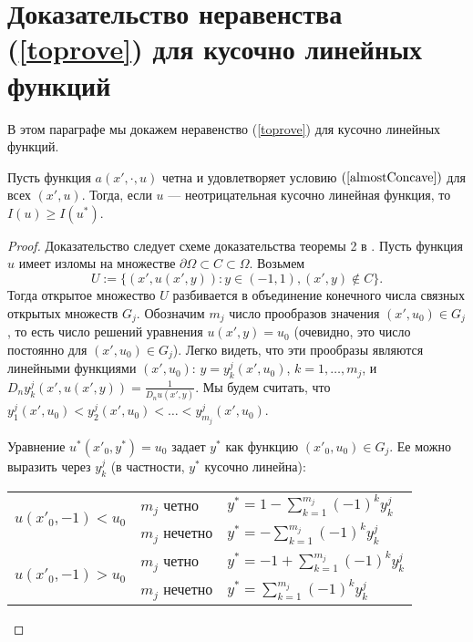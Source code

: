 \section{Доказательство неравенства (\ref{toprove}) для кусочно ли\-ней\-ных функций}

В этом параграфе мы докажем неравенство (\ref{toprove}) для кусочно линейных функций.

\begin{lm}
Пусть функция $a(x', \cdot, u)$ четна и удовлетворяет условию $(\ref{almostConcave})$ для всех $(x', u)$.
Тогда, если $u$ --- неотрицательная кусочно линейная функция, то $I( u ) \ge I( u^* )$.
\end{lm}

\begin{proof}
Доказательство следует схеме доказательства теоремы 2 в \cite{1dim}.
Пусть функция $u$ имеет изломы на множестве $\partial \Omega \subset C \subset \Omega$.
Возьмем $$U := \{ ( x', u( x', y ) ): y \in (-1, 1), (x', y) \not\in C \}.$$
Тогда открытое множество $U$ разбивается в объединение конечного числа связных открытых множеств $G_j$.
Обозначим $m_j$ число прообразов значения $( x', u_0 ) \in G_j$, то есть число решений уравнения $u( x', y ) = u_0$
(очевидно, это число постоянно для $( x', u_0 ) \in G_j$).
Легко видеть, что эти прообразы являются линейными функциями $( x', u_0 )$:
$y = y_k^j( x', u_0 )$, $k = 1, \dots, m_j$,
и $D_n y_k^j( x', u( x', y ) ) = \frac{1}{D_n u( x', y )}$.
Мы будем считать, что $y_1^j(x', u_0) < y_2^j(x', u_0) < \dots < y_{m_j}^j(x', u_0)$.

Уравнение $u^*(x'_0, y^*) = u_0$ задает $y^*$ как функцию $( x'_0, u_0 ) \in G_j$.
Ее можно выразить через $y_k^j$ (в частности, $y^*$ кусочно линейна):

\begin{center}
\begin{tabular}{l|l|l}
\multirow{2}{*}{$u( x'_0, -1 ) < u_0$ \rule[-34pt]{0pt}{65pt}} & $m_j$ четно   & $y^* = 1-\sum\limits_{k=1}^{m_j} (-1)^k y_k^j$ \rule[-17pt]{0pt}{40pt} \\
                                                               & $m_j$ нечетно & $y^* = -\sum\limits_{k=1}^{m_j} (-1)^k y_k^j$ \rule[-17pt]{0pt}{40pt} \\ \hline
\multirow{2}{*}{$u( x'_0, -1 ) > u_0$ \rule[-34pt]{0pt}{65pt}} & $m_j$ четно   & $y^* = -1+\sum\limits_{k=1}^{m_j} (-1)^k y_k^j$ \rule[-17pt]{0pt}{40pt} \\
                                                               & $m_j$ нечетно & $y^* = \sum\limits_{k=1}^{m_j} (-1)^k y_k^j$ \rule[-17pt]{0pt}{40pt} \\
\end{tabular}
\end{center}


\end{proof}
